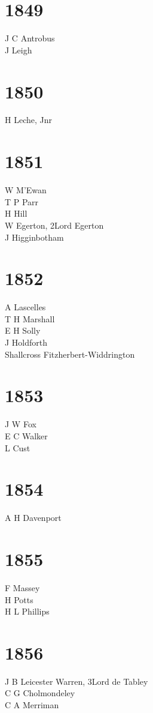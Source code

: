 \begin{multicols}{2}
  \section*{1849}
  J C Antrobus \\
  J Leigh \\
  \section*{1850}
  H Leche, Jnr \\
  \section*{1851}
  W M'Ewan \\
  T P Parr \\
  H Hill \\
  W Egerton, 2\nd Lord Egerton \\
  J Higginbotham \\
  \section*{1852}
  A Lascelles \\
  T H Marshall \\
  E H Solly \\
  J Holdforth \\
  Shallcross Fitzherbert-Widdrington \\
  \section*{1853}
  J W Fox \\
  E C Walker \\
  L Cust \\
  \section*{1854}
  A H Davenport \\
  \section*{1855}
  F Massey \\
  H Potts \\
  H L Phillips \\
  \section*{1856}
  J B Leicester Warren, 3\rd Lord de Tabley \\
  C G Cholmondeley \\
  C A Merriman \\

\end{multicols}
